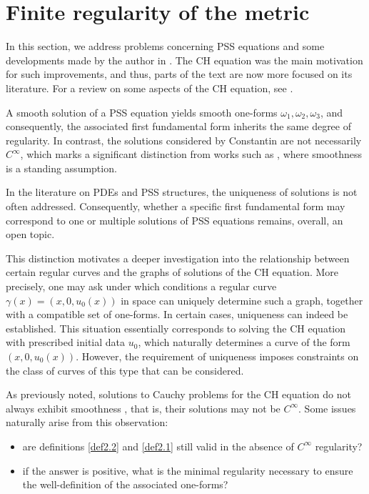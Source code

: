 \documentclass{cimart}
\begin{document}
\section{Finite regularity of the metric}

In this section, we address problems concerning PSS equations and some developments made by the author in \cite{nilay,freire-tito-sam,freire-ch,freire-dp,freire-arxiv,nazime}. The CH equation was the main motivation for such improvements, and thus, parts of the text are now more focused on its literature. For a review on some aspects of the CH equation, see \cite{freire-cm}.

A smooth solution of a PSS equation yields smooth one-forms $\omega_1, \omega_2, \omega_3$, and consequently, the associated first fundamental form inherits the same degree of regularity. In contrast, the solutions considered by Constantin \cite{const2000-1} are not necessarily $C^\infty$, which marks a significant distinction from works such as \cite{tarcisio,keti2015,reyes2000,reyes2002,reyes2006-sel,reyes2006-jde,reyes2011,sasaki}, where smoothness is a standing assumption.

In the literature on PDEs and PSS structures, the uniqueness of solutions is not often addressed. Consequently, whether a specific first fundamental form may correspond to one or multiple solutions of PSS equations remains, overall, an open topic.

This distinction motivates a deeper investigation into the relationship between certain regular curves and the graphs of solutions of the CH equation. More precisely, one may ask under which conditions a regular curve $\gamma(x)=(x,0,u_0(x))$ in space can uniquely determine such a graph, together with a compatible set of one-forms. In certain cases, uniqueness can indeed be established. This situation essentially corresponds to solving the CH equation with prescribed initial data $u_0$, which naturally determines a curve of the form $(x,0,u_0(x))$. However, the requirement of uniqueness imposes constraints on the class of curves of this type that can be considered.

As previously noted, solutions to Cauchy problems for the CH equation do not always exhibit smoothness \cite{const1998-1,const1998-2,const2000-1}, that is, their solutions may not be $C^\infty$. Some issues naturally arise from this observation:
\begin{itemize}
    \item are definitions \ref{def2.2} and \ref{def2.1} still valid in the absence of $C^\infty$ regularity?
    \item if the answer is positive, what is the minimal regularity necessary to ensure the well-definition of the associated one-forms?
\end{itemize}
\end{document}
